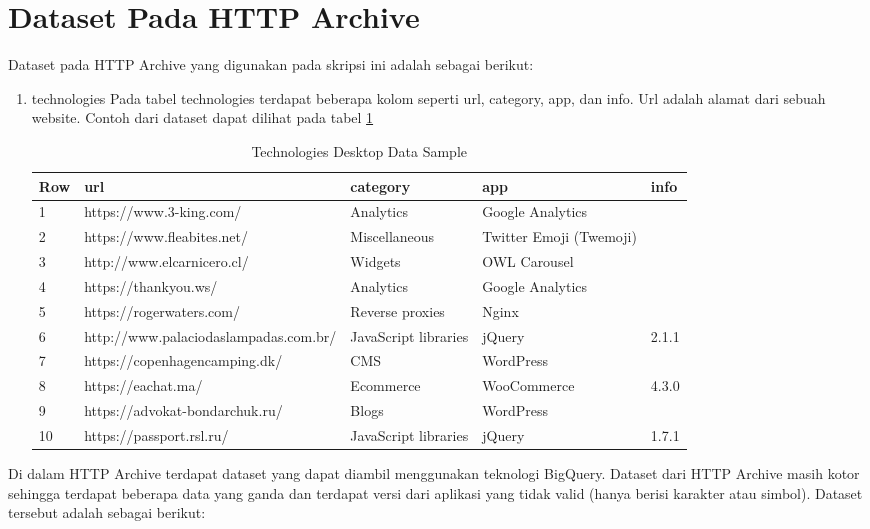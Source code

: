 \section{Dataset Pada HTTP Archive}
Dataset pada HTTP Archive yang digunakan pada skripsi ini adalah sebagai berikut:
\begin{enumerate}
	\item technologies
	Pada tabel technologies terdapat beberapa kolom seperti url, category, app, dan info. Url adalah alamat dari sebuah website. Contoh dari dataset dapat dilihat pada tabel \ref{table:ct_tech_desktop} 
	\begin{table}[H]
		\centering
		\begin{tabular}{|l|l|p{3cm}|p{3cm}|l|}
			\hline
			\textbf{Row} & \textbf{url} & \textbf{category} & app & info\\
			\hline
			1 & https://www.3-king.com/ & Analytics & Google Analytics & \\
			\hline
			2 & https://www.fleabites.net/ & Miscellaneous & Twitter Emoji (Twemoji) & \\
			\hline
			3 & http://www.elcarnicero.cl/ & Widgets & OWL Carousel & \\
			\hline
			4 & https://thankyou.ws/ & Analytics & Google Analytics & \\
			\hline
			5 & https://rogerwaters.com/ & Reverse proxies & Nginx & \\
			\hline
			6 & http://www.palaciodaslampadas.com.br/ & JavaScript libraries & jQuery & 2.1.1\\
			\hline
			7 & https://copenhagencamping.dk/ & CMS & WordPress & \\
			\hline
			8 & https://eachat.ma/ & Ecommerce & WooCommerce & 4.3.0\\
			\hline
			9 & https://advokat-bondarchuk.ru/ & Blogs & WordPress & \\
			\hline
			10 & https://passport.rsl.ru/ & JavaScript libraries & jQuery & 1.7.1\\
			\hline
		\end{tabular}
		\caption{Technologies Desktop Data Sample}
		\label{table:ct_tech_desktop}
	\end{table}
	
	
	
\end{enumerate}
Di dalam HTTP Archive terdapat dataset yang dapat diambil menggunakan teknologi BigQuery. Dataset dari HTTP Archive masih kotor sehingga terdapat beberapa data yang ganda dan terdapat versi dari aplikasi yang tidak valid (hanya berisi karakter atau simbol). Dataset tersebut adalah sebagai berikut:
